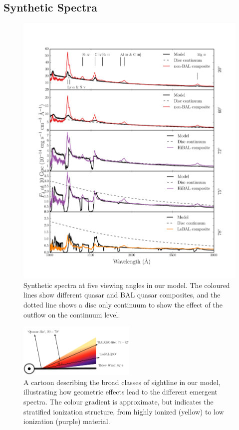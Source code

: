 \documentclass[useAMS,usenatbib]{mn2e_x}
\begin{document}
\subsection{Synthetic Spectra}

\begin{figure} %
\centering
\includegraphics[width=1.0\textwidth]{figures/uvspec.png}
\caption
{
Synthetic spectra at five viewing angles in our model. The coloured lines
show different quasar and BAL quasar composites, and the dotted line shows a disc
only continuum to show the effect of the outflow on the continuum level.
}
\label{fig:uvspec}
\end{figure} %

\begin{figure}
\centering
\includegraphics[width=0.5\textwidth]{figures/windnew3.png}
\caption
{
A cartoon describing the broad classes of sightline 
in our model, illustrating how geometric effects lead to 
the different emergent spectra. The colour gradient is approximate,
but indicates the stratified ionization structure, 
from highly ionized (yellow) to low ionization (purple) material.
}
\label{fig:sightline}
\end{figure}
\end{document}
